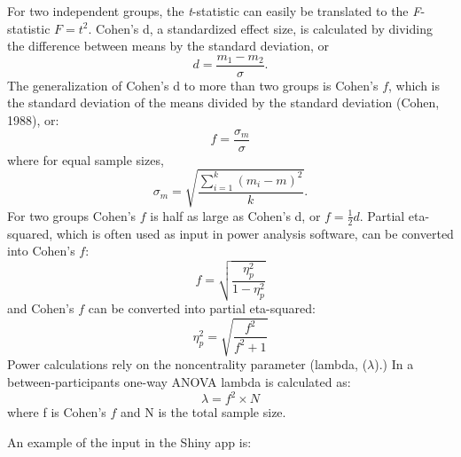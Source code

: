\documentclass[
  ,jou,floatsintext]{apa6}
\begin{document}
\begin{tcolorbox}[colback=black!5!white,colframe=white!5!black,title=Box 1. Formula for effect sizes for ANOVA designs]
For two independent groups, the \textit{t}-statistic can easily be translated to the \textit{F}-statistic $F = t^2$.
Cohen's d, a standardized effect size, is calculated by dividing the difference between means by the standard deviation, or 
\begin{equation}
d = \frac{m_1-m_2}{\sigma}.
\end{equation}
The generalization of Cohen's d to more than two groups is Cohen's $f$, which is the standard deviation of the means divided by the standard deviation (Cohen, 1988), or: 
\begin{equation}
f = \frac{\sigma _{ m }}{\sigma}
\end{equation}
where for equal sample sizes,
\begin{equation}
\sigma _{ m } = \sqrt { \frac { \sum_ { i = 1 } ^ { k } ( m _ { i } - m ) ^ { 2 } } { k } }.
\end{equation}
For two groups Cohen's $f$ is half as large as Cohen's d, or $f = \frac{1}{2}d$.
Partial eta-squared, which is often used as input in power analysis software, can be converted into Cohen's $f$:
\begin{equation}
f = \sqrt{\frac{\eta_p^2}{1-\eta_p^2}} \label{eq:eta-to-f}
\end{equation}
and Cohen's $f$ can be converted into partial eta-squared:
\begin{equation}
\eta_p^2 = \sqrt{\frac{f^2}{f^2+1}} \label{eq:f-to-eta}
\end{equation}
Power calculations rely on the noncentrality parameter (lambda, ($\lambda$).) 
In a between-participants one-way ANOVA lambda is calculated as:
\begin{equation}
\lambda = f^2 \times N \label{eq:lambda}
\end{equation}
where f is Cohen's $f$ and N is the total sample size. 
\end{tcolorbox}

An example of the input in the Shiny app is:
\end{document}
